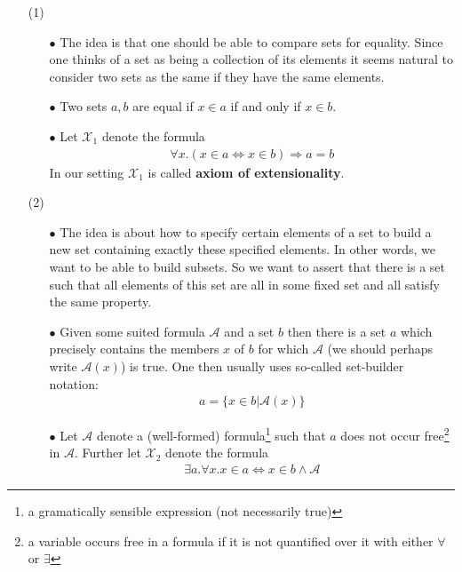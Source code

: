 \begin{enumerate}
\item[(1)]
\begin{enumerate}
\item[$\bullet$]
The idea is that one should be able to compare sets for equality. Since one thinks of a set as being a collection of its elements it seems natural to consider two sets as the same if they have the same elements.
\item[$\bullet$]
Two sets $a,b$ are equal if $x \in a$ if and only if $x \in b$.
\item[$\bullet$]
Let $\mathcal{X}_{1}$ denote the formula
\begin{align*}
  \forall
  x
  .
  \left(
    x
    \in
    a
    \Leftrightarrow
    x
    \in
    b
  \right)
  \Rightarrow
  a
  =
  b
\end{align*}
In our setting $\mathcal{X}_{1}$ is called \textbf{axiom of extensionality}.
\end{enumerate}
\item[(2)]
\begin{enumerate}
\item[$\bullet$]
The idea is about how to specify certain elements of a set to build a new set containing exactly these specified elements. In other words, we want to be able to build subsets. So we want to assert that there is a set such that all elements of this set are all in some fixed set and all satisfy the same property.
\item[$\bullet$]
Given some suited formula $\mathcal{A}$ and a set $b$ then there is a set $a$ which precisely contains the members $x$ of $b$ for which $\mathcal{A}$ (we should perhaps write $\mathcal{A}(x)$) is true. One then usually uses so-called set-builder notation:
\begin{align*}
  a
  =
  \lbrace
      x
      \in
      b
    \vert
      \mathcal{A}(x)
  \rbrace
\end{align*}
\item[$\bullet$]
Let $\mathcal{A}$ denote a (well-formed) formula\footnote{a gramatically sensible expression (not necessarily true)} such that $a$ does not occur free\footnote{a variable occurs free in a formula if it is not quantified over it with either $\forall$ or $\exists$} in $\mathcal{A}$. Further let $\mathcal{X}_{2}$ denote the formula
\begin{align*}
  \exists
  a
  .
  \forall
  x
  .
  x
  \in
  a
  \Leftrightarrow
  x
  \in
  b
  \land
  \mathcal{A}
\end{align*}

\end{enumerate}
\end{enumerate}
